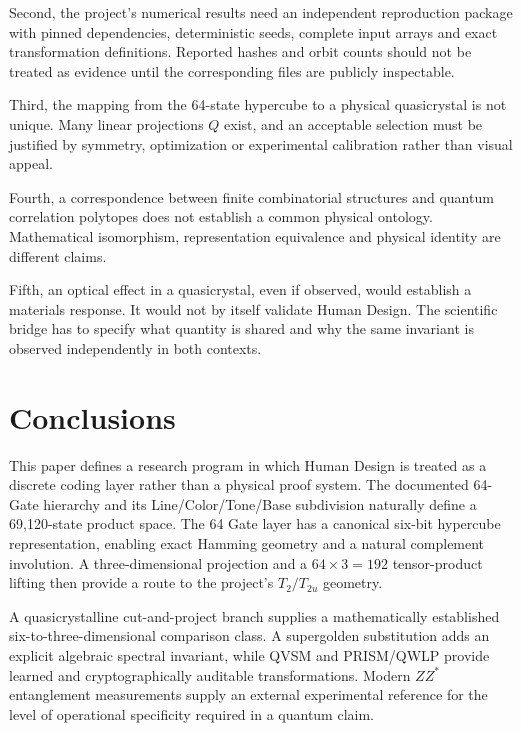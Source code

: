 \documentclass[11pt,a4paper]{article}
\numberwithin{equation}{section}
\begin{document}
Second, the project's numerical results need an independent reproduction package with pinned dependencies, deterministic seeds, complete input arrays and exact transformation definitions. Reported hashes and orbit counts should not be treated as evidence until the corresponding files are publicly inspectable.

Third, the mapping from the 64-state hypercube to a physical quasicrystal is not unique. Many linear projections $Q$ exist, and an acceptable selection must be justified by symmetry, optimization or experimental calibration rather than visual appeal.

Fourth, a correspondence between finite combinatorial structures and quantum correlation polytopes does not establish a common physical ontology. Mathematical isomorphism, representation equivalence and physical identity are different claims.

Fifth, an optical effect in a quasicrystal, even if observed, would establish a materials response. It would not by itself validate Human Design. The scientific bridge has to specify what quantity is shared and why the same invariant is observed independently in both contexts.

\section{Conclusions}
\label{sec:conclusion}

This paper defines a research program in which Human Design is treated as a discrete coding layer rather than a physical proof system. The documented 64-Gate hierarchy and its Line/Color/Tone/Base subdivision naturally define a 69,120-state product space. The 64 Gate layer has a canonical six-bit hypercube representation, enabling exact Hamming geometry and a natural complement involution. A three-dimensional projection and a $64\times3=192$ tensor-product lifting then provide a route to the project's $T_2/T_{2u}$ geometry.

A quasicrystalline cut-and-project branch supplies a mathematically established six-to-three-dimensional comparison class. A supergolden substitution adds an explicit algebraic spectral invariant, while QVSM and PRISM/QWLP provide learned and cryptographically auditable transformations. Modern $ZZ^*$ entanglement measurements supply an external experimental reference for the level of operational specificity required in a quantum claim.
\end{document}
